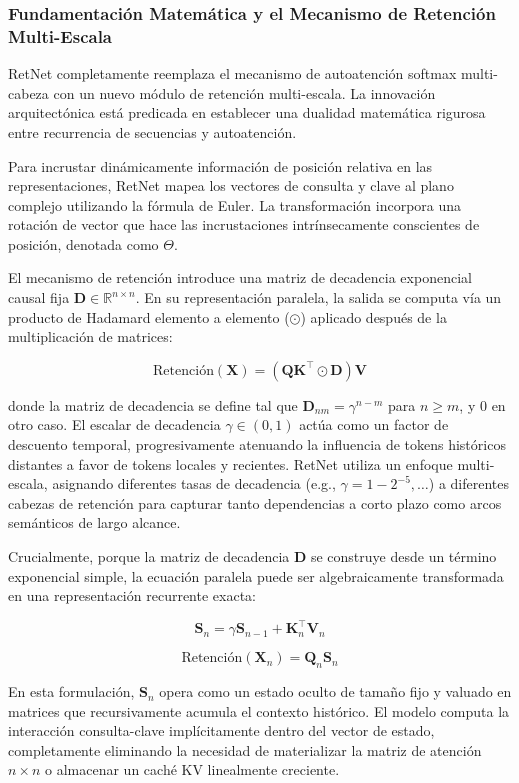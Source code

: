 \documentclass[11pt,a4paper]{article}
\begin{document}
\subsubsection{Fundamentación Matemática y el Mecanismo de Retención Multi-Escala}

RetNet completamente reemplaza el mecanismo de autoatención softmax multi-cabeza con un nuevo módulo de retención multi-escala. La innovación arquitectónica está predicada en establecer una dualidad matemática rigurosa entre recurrencia de secuencias y autoatención.

Para incrustar dinámicamente información de posición relativa en las representaciones, RetNet mapea los vectores de consulta y clave al plano complejo utilizando la fórmula de Euler. La transformación incorpora una rotación de vector que hace las incrustaciones intrínsecamente conscientes de posición, denotada como $\Theta$.

El mecanismo de retención introduce una matriz de decadencia exponencial causal fija $\mathbf{D} \in \mathbb{R}^{n \times n}$. En su representación paralela, la salida se computa vía un producto de Hadamard elemento a elemento ($\odot$) aplicado después de la multiplicación de matrices:

$$
\text{Retención}(\mathbf{X}) = (\mathbf{Q}\mathbf{K}^\top \odot \mathbf{D})\mathbf{V}
$$

donde la matriz de decadencia se define tal que $\mathbf{D}_{nm} = \gamma^{n-m}$ para $n \ge m$, y $0$ en otro caso. El escalar de decadencia $\gamma \in (0, 1)$ actúa como un factor de descuento temporal, progresivamente atenuando la influencia de tokens históricos distantes a favor de tokens locales y recientes. RetNet utiliza un enfoque multi-escala, asignando diferentes tasas de decadencia (e.g., $\gamma = 1 - 2^{-5}, \dots$) a diferentes cabezas de retención para capturar tanto dependencias a corto plazo como arcos semánticos de largo alcance.

Crucialmente, porque la matriz de decadencia $\mathbf{D}$ se construye desde un término exponencial simple, la ecuación paralela puede ser algebraicamente transformada en una representación recurrente exacta:

$$
\mathbf{S}_n = \gamma \mathbf{S}_{n-1} + \mathbf{K}_n^\top \mathbf{V}_n
$$

$$
\text{Retención}(\mathbf{X}_n) = \mathbf{Q}_n \mathbf{S}_n
$$

En esta formulación, $\mathbf{S}_n$ opera como un estado oculto de tamaño fijo y valuado en matrices que recursivamente acumula el contexto histórico. El modelo computa la interacción consulta-clave implícitamente dentro del vector de estado, completamente eliminando la necesidad de materializar la matriz de atención $n \times n$ o almacenar un caché KV linealmente creciente.
\end{document}
